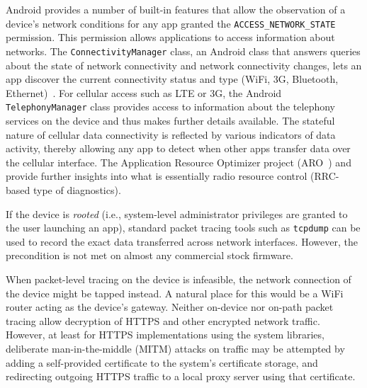 Android provides a number of built-in features that allow the observation 
of a device's network conditions for any app granted the 
\texttt{ACCESS\_NETWORK\_STATE} permission. This permission 
allows applications to access information about networks.
The \texttt{ConnectivityManager} class, an Android class that 
answers queries about the state of network connectivity and 
network connectivity changes, lets an app discover the 
current connectivity status and type (WiFi, 3G, Bluetooth, Ethernet)~\cite{che2011case}. 
For cellular access such as LTE or 3G, the Android \texttt{TelephonyManager} 
class provides access to information about the telephony services on the 
device and thus makes further details available. The stateful nature of cellular 
data connectivity is reflected by various indicators of data activity, 
thereby allowing any app to detect when other apps transfer data over 
the cellular interface.  The Application Resource Optimizer project
(ARO~\cite{aro}) and \cite{Ricciato2010551} 
provide further insights into what is 
essentially radio resource control (RRC-based type of diagnostics).


If the device is \textit{rooted} (i.e., system-level administrator 
privileges are granted to the user launching an app), standard 
packet tracing tools such as \texttt{tcpdump} can be used to 
record the exact data transferred across network interfaces. 
However, the precondition is not met on almost any commercial stock 
firmware.

When packet-level tracing on the device is infeasible, the network 
connection of the device might be tapped instead. A natural place 
for this would be a WiFi router acting as the device's gateway. 
Neither on-device nor on-path packet tracing allow decryption of 
HTTPS and other encrypted network traffic. However, at least for 
HTTPS implementations using the system libraries, deliberate 
man-in-the-middle (MITM) attacks on traffic may be attempted 
by adding a self-provided certificate to the system's certificate 
storage, and redirecting outgoing HTTPS traffic to a local proxy 
server using that certificate.
